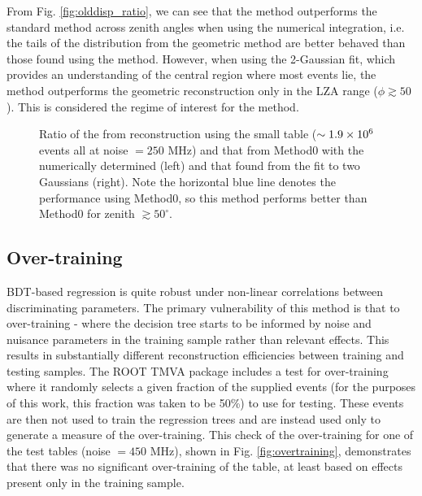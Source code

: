 \documentclass[main.tex]{subfiles}
\begin{document}
From Fig. \ref{fig:olddisp_ratio}, we can see that the \disp method outperforms the standard method across zenith angles when using the numerical integration, i.e. the tails of the distribution from the geometric method are better behaved than those found using the \disp method. However, when using the 2-Gaussian fit, which provides an understanding of the central region where most events lie, the \disp method outperforms the geometric reconstruction only in the LZA range ($\phi\gtrsim 50$). This is considered the regime of interest for the \disp method.

\begin{figure}[H]
  \centering
  \caption[Small \disp table reconstruction (noise = $250$ MHz).]{Ratio of the \rse from reconstruction using the small \disp table ($\sim 1.9\times 10^{6}$ events all at noise $= 250$ MHz) and that from Method0 with the numerically determined \rse (left) and that found from the fit to two Gaussians (right). Note the horizontal blue line denotes the performance using Method0, so this method performs better than Method0 for zenith $\gtrsim 50^\circ$.}
  \label{fig:disp_ratio_250}
\end{figure}

\subsection{Over-training}
BDT-based regression is quite robust under non-linear correlations between discriminating parameters. The primary vulnerability of this method is that  to over-training - where the decision tree starts to be informed by noise and nuisance parameters in the training sample rather than relevant effects. This results in substantially different reconstruction efficiencies between training and testing samples. The ROOT TMVA package includes a test for over-training where it randomly selects a given fraction of the supplied events (for the purposes of this work, this fraction was taken to be 50\%) to use for testing. These events are then not used to train the regression trees and are instead used only to generate a measure of the over-training.
This check of the over-training for one of the test tables (noise $= 450$ MHz), shown in Fig. \ref{fig:overtraining}, demonstrates that there was no significant over-training of the table, at least based on effects present only in the training sample.
\end{document}
